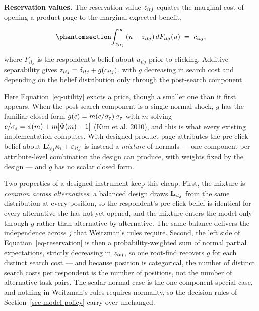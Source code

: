 \documentclass[
  letterpaper,
  DIV=11,
  numbers=noendperiod]{scrartcl}
\begin{document}
\textbf{Reservation values.} The reservation value \(z_{itj}\)
equates the marginal cost of opening a product page to the marginal
expected benefit,

\begin{equation}\protect\phantomsection\label{eq-reservation}{
\int_{\resv_{itj}}^{\infty} \left(u - \resv_{itj}\right) dF_{itj}(u) \;=\; \cost_{itj},
}\end{equation}

where \(F_{itj}\) is the respondent's belief about \(u_{itj}\) prior to
clicking. Additive separability gives
\(z_{itj} = \delta_{itj} + g(c_{itj})\), with \(g\) decreasing
in search cost and depending on the belief distribution only through the
post-search component.

Here Equation~\ref{eq-utility} exacts a price, though a smaller one than
it first appears. When the post-search component is a single normal
shock, \(g\) has the familiar closed form
\(g(c) = m(c/\sigma_\varepsilon)\,\sigma_\varepsilon\) with
\(m\) solving \(c/\sigma_\varepsilon = \phi(m) + m[\Phi(m)-1]\) (Kim
et al. 2010), and this is what every existing implementation computes.
With designed product-page attributes the pre-click belief about
\(\mathbf{L}_{itj}'\boldsymbol{\kappa}_i + \varepsilon_{itj}\) is instead a
\emph{mixture} of normals --- one component per attribute-level
combination the design can produce, with weights fixed by the design ---
and \(g\) has no scalar closed form.

Two properties of a designed instrument keep this cheap. First, the
mixture is \emph{common across alternatives}: a balanced design draws
\(\mathbf{L}_{itj}\) from the same distribution at every position, so the
respondent's pre-click belief is identical for every alternative she has
not yet opened, and the mixture enters the model only through \(g\)
rather than alternative by alternative. The same balance delivers the
independence across \(j\) that Weitzman's rules require. Second, the
left side of Equation~\ref{eq-reservation} is then a
probability-weighted sum of normal partial expectations, strictly
decreasing in \(z_{itj}\), so one root-find recovers \(g\) for each
distinct search cost --- and because position is categorical, the number
of distinct search costs per respondent is the number of positions, not
the number of alternative-task pairs. The scalar-normal case is the
one-component special case, and nothing in Weitzman's rules requires
normality, so the decision rules of Section~\ref{sec-model-policy} carry
over unchanged.
\end{document}
